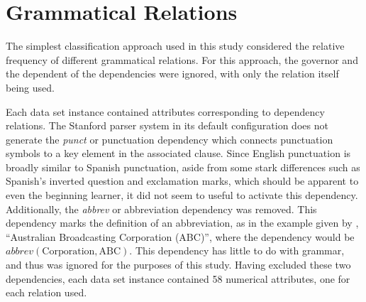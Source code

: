 \documentclass[main.tex]{subfiles}
\begin{document}
\section{Grammatical Relations}
 

The simplest classification approach used in this study considered the relative frequency of different grammatical relations. For this approach, the governor and the dependent of the dependencies were ignored, with only the relation itself being used. 

Each data set instance contained attributes corresponding to dependency relations. The Stanford parser system in its default configuration does not generate the \textit{punct} or punctuation dependency which connects punctuation symbols to a key element in the associated clause. Since English punctuation is broadly similar to Spanish punctuation, aside from some stark differences such as Spanish's inverted question and exclamation marks, which should be apparent to even the beginning learner, it did not seem to useful to activate this dependency. Additionally, the \textit{abbrev} or abbreviation dependency was removed. This dependency marks the definition of an abbreviation, as in the example given by \citet{typed-deps-manual}, ``Australian Broadcasting Corporation (ABC)'', where the dependency would be $abbrev(\text{Corporation},\text{ABC})$. This dependency has little to do with grammar, and thus was ignored for the purposes of this study. Having excluded these two dependencies, each data set instance contained 58 numerical attributes, one for each relation used.
\end{document}
